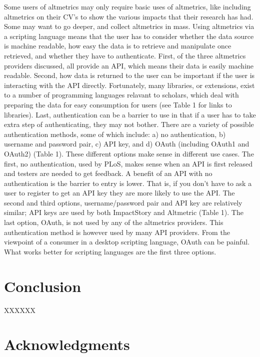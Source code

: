 \documentclass[letterpaper,superscriptaddress,showkeys,longbibliography]{revtex4-1}\usepackage{graphicx, color}
\begin{document}
Some users of altmetrics may only require basic uses of altmetrics, like including altmetrics on their CV's \cite{piwowar2013power} to show the various impacts that their research has had. Some may want to go deeper, and collect altmetrics in mass. Using altmetrics via a scripting language means that the user has to consider whether the data source is machine readable, how easy the data is to retrieve and manipulate once retrieved, and whether they have to authenticate. First, of the three altmetrics providers discussed, all provide an API, which means their data is easily machine readable. Second, how data is returned to the user can be important if the user is interacting with the API directly. Fortunately, many libraries, or extensions, exist to a number of programming languages relavant to scholars, which deal with preparing the data for easy consumption for users (see Table 1 for links to libraries). Last, authentication can be a barrier to use in that if a user has to take extra step of authenticating, they may not bother. There are a variety of possible authentication methods, some of which include: a) no authentication, b) username and password pair, c) API key, and d) OAuth (including OAuth1 and OAuth2) (Table 1). These different options make sense in different use cases. The first, no authentication, used by PLoS, makes sense when an API is first released and testers are needed to get feedback. A benefit of an API with no authentication is the barrier to entry is lower. That is, if you don't have to ask a user to register to get an API key they are more likely to use the API. The second and third options, username/password pair and API key are relatively similar; API keys are used by both ImpactStory and Altmetric (Table 1). The last option, OAuth, is not used by any of the altmetrics providers. This authentication method is however used by many API providers. From the viewpoint of a consumer in a desktop scripting language, OAuth can be painful. What works better for scripting languages are the first three options.  

\section*{Conclusion}

XXXXXX

\section*{Acknowledgments}
\end{document}
